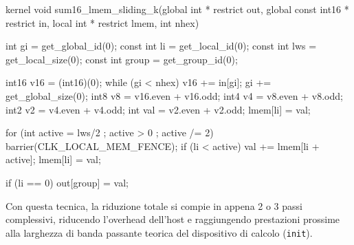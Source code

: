 \begin{code}[caption={Kernel di riduzione con sliding window vettoriale e local memory}, label={code:sum16_lmem_sliding_k}]
kernel void sum16_lmem_sliding_k(global int * restrict out,
                                  global const int16 * restrict in,
                                  local int * restrict lmem, int nhex)
{
    int gi = get_global_id(0);
    const int li = get_local_id(0);
    const int lws = get_local_size(0);
    const int group = get_group_id(0);

    int16 v16 = (int16)(0);
    while (gi < nhex) {
        v16 += in[gi];
        gi += get_global_size(0);
    }
    int8 v8 = v16.even + v16.odd;
    int4 v4 = v8.even + v8.odd;
    int2 v2 = v4.even + v4.odd;
    int val = v2.even + v2.odd;
    lmem[li] = val;

    for (int active = lws/2 ; active > 0 ; active /= 2) {
        barrier(CLK_LOCAL_MEM_FENCE);
        if (li < active) {
            val += lmem[li + active];
            lmem[li] = val;
        }
    }

    if (li == 0) {
        out[group] = val;
    }
}
\end{code}

Con questa tecnica, la riduzione totale si compie in appena 2 o 3 passi complessivi, riducendo l'overhead dell'host e raggiungendo prestazioni prossime alla larghezza di banda passante teorica del dispositivo di calcolo (\texttt{init}).
